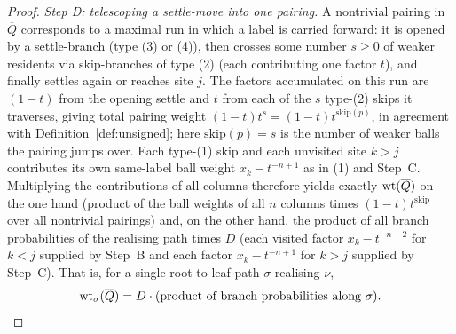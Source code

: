 \begin{proof}
\medskip
\noindent\emph{Step D: telescoping a settle-move into one pairing.}
A nontrivial pairing in $\overline Q$ corresponds to a maximal run in which a label
is carried forward: it is opened by a settle-branch (type (3) or (4)), then
crosses some number $s\ge0$ of weaker residents via skip-branches of type (2)
(each contributing one factor $t$), and finally settles again or reaches site
$j$. The factors accumulated on this run are $(1-t)$ from the opening settle and
$t$ from each of the $s$ type-(2) skips it traverses, giving total pairing weight
$(1-t)t^{s}=(1-t)t^{\mathrm{skip}(p)}$, in agreement with
Definition~\ref{def:unsigned}; here $\mathrm{skip}(p)=s$ is the number of weaker
balls the pairing jumps over. Each type-(1) skip and each unvisited site $k>j$
contributes its own same-label ball weight $x_k-t^{-n+1}$ as in (1) and Step~C.
Multiplying the contributions of all columns therefore yields exactly
$\operatorname{wt}(\overline Q)$ on the one hand (product of the ball weights of all $n$
columns times $(1-t)t^{\mathrm{skip}}$ over all nontrivial pairings) and, on the
other hand, the product of all branch probabilities of the realising path times
$D$ (each visited factor $x_k-t^{-n+2}$ for $k<j$ supplied by Step~B and each
factor $x_k-t^{-n+1}$ for $k>j$ supplied by Step~C). That is, for a single
root-to-leaf path $\sigma$ realising $\nu$,
\[
\operatorname{wt}_\sigma(\overline Q)=D\cdot(\text{product of branch probabilities along }\sigma).
\]


\end{proof}
